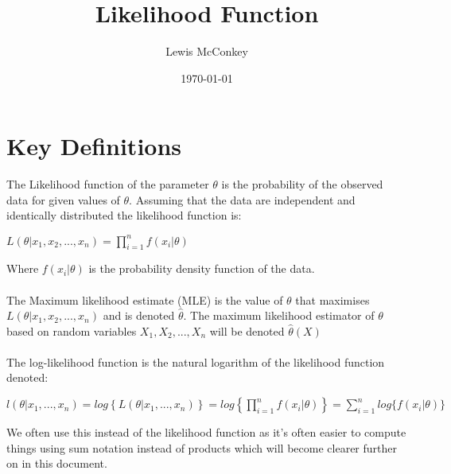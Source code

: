 \documentclass[,oneside]{article}
\author{Lewis McConkey}
\date{\today}
\title{ \LARGE{Likelihood Function}}
\numberwithin{equation}{section}
\begin{document}
\maketitle
\section{Key Definitions}
The Likelihood function of the parameter $\theta$ is the probability of the observed data for given values of $\theta$. Assuming that the data are independent and identically distributed  the likelihood function is:
\begin{center}
$L(\theta|x_1, x_2,..., x_n)= \prod\limits_{ i = 1}^{n} f(x_i|\theta)$
\end{center}
Where $f(x_i|\theta)$ is the probability density function of the data.\\ \\
The Maximum likelihood estimate (MLE) is the value of $\theta$ that maximises $L(\theta|x_1, x_2,..., x_n)$ and is denoted $\hat{\theta}.$ The maximum likelihood estimator of $\theta$ based on random variables $X_1,X_2,...,X_n$ will be denoted $\hat{\theta}(X)$\\ \\

The log-likelihood function is the natural logarithm of the likelihood function denoted:
\begin{center}
$l(\theta|x_1, ..., x_n)= log\left\{L(\theta|x_1,..., x_n)\right\}=log\left \{\prod\limits_{ i = 1}^{n} f(x_i|\theta)\right \}=\sum\limits_{i=1}^{n} log\{f(x_i|\theta)\}$
\end{center}
We often use this instead of the likelihood function as it's often easier to compute things using sum notation instead of products which will become clearer further on in this document.
\end{document}
